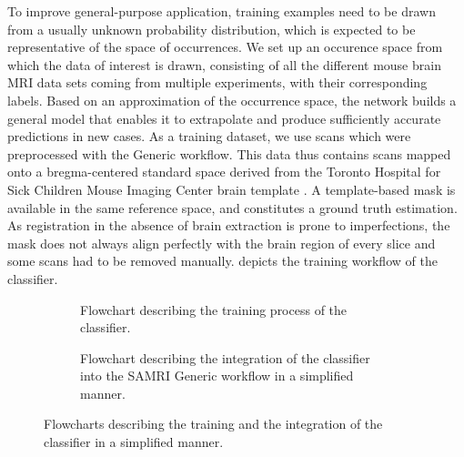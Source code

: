 To improve general-purpose application, training examples need to be drawn from a usually unknown probability distribution, which is expected to be representative of the space of occurrences.
We set up an occurence space from which the data of interest is drawn, consisting of all the different mouse brain MRI data sets coming from multiple experiments, with their corresponding labels.
Based on an approximation of the occurrence space, the network builds a general model that enables it to extrapolate and produce sufficiently accurate predictions in new cases.
As a training dataset, we use scans which were preprocessed with the \cite[SAMRI]{noauthor_ibt-fmi/samri_2019} Generic workflow.
This data thus contains scans mapped onto a bregma-centered standard \cite{ioanas_optimized_2019} space derived from the Toronto Hospital for Sick Children Mouse Imaging Center brain template \cite{dsu}.
A template-based mask is available in the same reference space, and constitutes a ground truth estimation.
As registration in the absence of brain extraction is prone to imperfections, the mask does not always align perfectly with the brain region of every slice and some scans had to be removed manually.
 depicts the training workflow of the classifier.

\begin{figure*}[h!]
    \begin{subfigure}{0.45\textwidth}
        \centering
        \vspace{-1.9em}
        \caption{
        Flowchart describing the training process of the classifier.
        }
        \label{fig:training_graph}
    \end{subfigure}
    \begin{subfigure}{0.45\linewidth}
        \centering
        \vspace{-1.9em}
        \caption{
        Flowchart describing the integration of the classifier into the SAMRI Generic workflow in a simplified manner.
        }
        \label{fig:workflow_graph}
    \end{subfigure}\hfill
    \caption{
        Flowcharts describing the training and the integration of the classifier in a simplified manner.
    }
    \label{fig:model_graphs}
\end{figure*}
